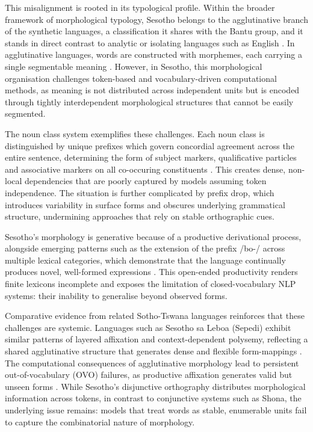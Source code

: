\documentclass[11pt,a4paper]{article}
\begin{document}
This misalignment is rooted in its typological profile. Within the broader framework of morphological typology, Sesotho belongs to the agglutinative branch of the synthetic languages, a classification it shares with the Bantu group, and it stands in direct contrast to analytic or isolating languages such as English \citep{kambarami2021out,masethe2022word}. In agglutinative languages, words are constructed with morphemes, each carrying a single segmentable meaning \citep{kambarami2021out}. However, in Sesotho, this morphological organisation challenges token-based and vocabulary-driven computational methods, as meaning is not distributed across independent units but is encoded through tightly interdependent morphological structures that cannot be easily segmented. 

The noun class system exemplifies these challenges. Each noun class is distinguished by unique prefixes which govern concordial agreement across the entire sentence, determining the form of subject markers, qualificative particles and associative markers on all co-occuring constituents \citep{mokoaleli2020sesotho}. This creates dense, non-local dependencies that are poorly captured by models assuming token independence. The situation is further complicated by prefix drop, which introduces variability in surface forms and obscures underlying grammatical structure, undermining approaches that rely on stable orthographic cues.

Sesotho's morphology is generative because of a productive derivational process, alongside emerging patterns such as the extension of the prefix /bo-/ across multiple lexical categories, which demonstrate that the language continually produces novel, well-formed expressions \citep{mokoaleli2020sesotho,moloi2014morphology}. This open-ended productivity renders finite lexicons incomplete and exposes the limitation of closed-vocabulary NLP systems: their inability to generalise beyond observed forms.

Comparative evidence from related Sotho-Tswana languages reinforces that these challenges are systemic. Languages such as Sesotho sa Leboa (Sepedi) exhibit similar patterns of layered affixation and context-dependent polysemy, reflecting a shared agglutinative structure that generates dense and flexible form-mappings \citep{masethe2022word}. The computational consequences of agglutinative morphology lead to persistent out-of-vocabulary (OVO) failures, as productive affixation generates valid but unseen forms \citep{kambarami2021out}. While Sesotho's disjunctive orthography distributes morphological information across tokens, in contrast to conjunctive systems such as Shona, the underlying issue remains: models that treat words as stable, enumerable units fail to capture the combinatorial nature of morphology.
\end{document}
